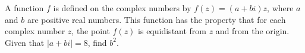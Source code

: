 A function $f$ is defined on the complex numbers by $f(z)=(a+bi)z$, where $a$ and $b$ are positive real numbers. This function has the property that for each complex number $z$, the point $f(z)$ is equidistant from $z$ and from the origin. Given that $|a+bi|=8$, find $b^2$.

